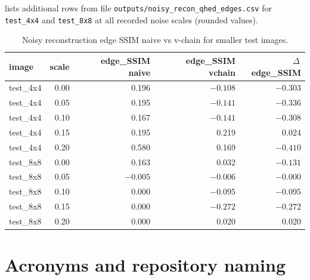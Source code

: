  lists additional rows from file \texttt{outputs/noisy\_recon\_qhed\_edges.csv} for \texttt{test\_4x4} and \texttt{test\_8x8} at all recorded noise scales (rounded values).
\begin{table}[htbp]
\centering
\footnotesize
\caption{Noisy reconstruction edge SSIM naive vs v-chain for smaller test images.}
\label{tab:noisy-long}
\begin{tabular}{p{2.0cm}rrrr}
\toprule
image & scale & edge\_SSIM naive & edge\_SSIM vchain & $\Delta$\,edge\_SSIM \\
\midrule
test\_4x4 & 0.00 & 0.196 & $-0.108$ & $-0.303$ \\
test\_4x4 & 0.05 & 0.195 & $-0.141$ & $-0.336$ \\
test\_4x4 & 0.10 & 0.167 & $-0.141$ & $-0.308$ \\
test\_4x4 & 0.15 & 0.195 & 0.219 & 0.024 \\
test\_4x4 & 0.20 & 0.580 & 0.169 & $-0.410$ \\
test\_8x8 & 0.00 & 0.163 & 0.032 & $-0.131$ \\
test\_8x8 & 0.05 & $-0.005$ & $-0.006$ & $-0.000$ \\
test\_8x8 & 0.10 & $0.000$ & $-0.095$ & $-0.095$ \\
test\_8x8 & 0.15 & $0.000$ & $-0.272$ & $-0.272$ \\
test\_8x8 & 0.20 & $0.000$ & 0.020 & 0.020 \\
\bottomrule
\end{tabular}
\end{table}

\chapter{Acronyms and repository naming}

